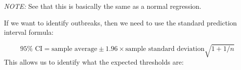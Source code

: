 \documentclass[]{book}
\newenvironment{Shaded}{\begin{snugshade}}{\end{snugshade}}
\newcommand{\KeywordTok}[1]{\textcolor[rgb]{0.13,0.29,0.53}{\textbf{#1}}}
\newcommand{\DataTypeTok}[1]{\textcolor[rgb]{0.13,0.29,0.53}{#1}}
\newcommand{\DecValTok}[1]{\textcolor[rgb]{0.00,0.00,0.81}{#1}}
\newcommand{\StringTok}[1]{\textcolor[rgb]{0.31,0.60,0.02}{#1}}
\newcommand{\OperatorTok}[1]{\textcolor[rgb]{0.81,0.36,0.00}{\textbf{#1}}}
\newcommand{\ErrorTok}[1]{\textcolor[rgb]{0.64,0.00,0.00}{\textbf{#1}}}
\newcommand{\NormalTok}[1]{#1}
\begin{document}
\emph{NOTE:} See that this is basically the same as a normal regression.

If we want to identify outbreaks, then we need to use the standard
prediction interval formula:

\[
\text{95%
\] This allows us to identify what the expected thresholds are:

\begin{Shaded}
\end{Shaded}
\end{document}
